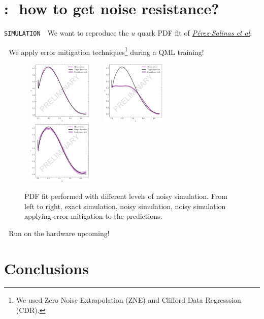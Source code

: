 \documentclass[9pt, xcolor={svgnames}, hyperref={colorlinks, linkcolor=black, citecolor=amethyst, urlcolor=amethyst}]{beamer}
\begin{document}
\section{\faHandPeaceO:\,\, how to get noise resistance?}

\begin{frame}{\texttt{SIMULATION}}
\small
\faArrowCircleRight\,\, We want to reproduce the $u$ quark PDF fit of \href{https://arxiv.org/abs/2011.13934}{\textit{Pérez-Salinas et al}}.

\pause
\faArrowCircleRight\,\, We apply error mitigation techniques\footnote{
    We used Zero Noise Extrapolation (ZNE) and Clifford Data Regresssion (CDR).
} during
a QML training! 
\pause
    \begin{figure}
    \includegraphics[height=3cm, width=0.33\textwidth]{figures/exact.pdf}%
    \includegraphics[height=3cm, width=0.33\textwidth]{figures/noisy.pdf}%
    \includegraphics[height=3cm, width=0.33\textwidth]{figures/mitigated.pdf}%
    \caption{PDF fit performed with different levels of noisy simulation. 
    From left to right, exact simulation, noisy simulation, noisy simulation 
    applying error mitigation to the predictions.}
    \end{figure}
\pause
\faArrowCircleRight\,\, Run on the hardware upcoming!
\end{frame}

\section{Conclusions}
\end{document}
